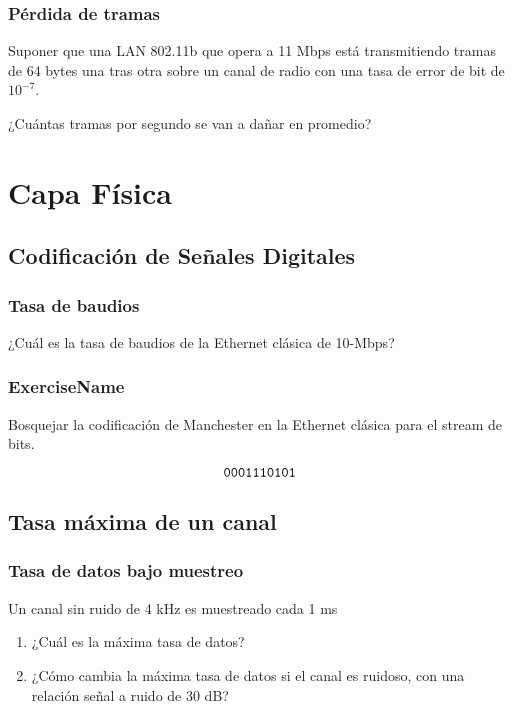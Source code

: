\documentclass[12pt]{report}
\begin{document}
\begin{exer}
	\subsection{Pérdida de tramas \sthree}
	Suponer que una LAN 802.11b que opera a 11 Mbps está transmitiendo tramas de 64 bytes una tras otra sobre un canal de radio con una tasa de error de bit de $10^{-7}$.

	¿Cuántas tramas por segundo se van a dañar en promedio?
\end{exer}

%
%


\chapter{Capa Física}

\begin{exer}
	\section{Codificación de Señales Digitales}
	\subsection{Tasa de baudios \stwo \steo}
	¿Cuál es la tasa de baudios de la Ethernet clásica de 10-Mbps?
\end{exer}

\begin{exer}
	\subsection{ExerciseName \sone}
	Bosquejar la codificación de Manchester en la Ethernet clásica para el stream de bits.

	$$ \texttt{0001110101} $$
\end{exer}

\begin{exer}
	\section{Tasa máxima de un canal}
	\subsection{Tasa de datos bajo muestreo \sthree}
	Un canal sin ruido de 4 kHz es muestreado cada 1 ms

	\begin{enumerate}
		\item ¿Cuál es la máxima tasa de datos?
		\item ¿Cómo cambia la máxima tasa de datos si el canal es ruidoso, con una relación señal a ruido de 30 dB?
	\end{enumerate}
\end{exer}
\end{document}
